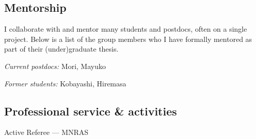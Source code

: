 \documentclass[12pt,letterpaper]{article}
\begin{document}
\subsection{Mentorship}
I collaborate with and mentor many students and postdocs, often on a single
project.
Below is a list of the group members who I have formally mentored as part of their (under)graduate thesis.

\begin{list}{}{\cvlist}
\item \emph{Current postdocs:}
  Mori, Mayuko
\item \emph{Former students:}
  Kobayashi, Hiremasa
\end{list}




\subsection{Professional service \& activities}
\begin{list}{}{\cvlist}
  \item Active Referee ---
        MNRAS
\end{list}
\end{document}
